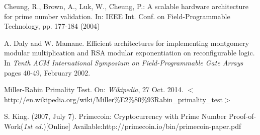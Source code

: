 \documentclass[journal]{IEEEtran}
\begin{document}
\ifCLASSOPTIONcaptionsoff
  \newpage
\fi





%
%
%
\begin{thebibliography}{1}

Cheung, R., Brown, A., Luk, W., Cheung, P.: A scalable hardware architecture for prime number validation. In: IEEE Int. Conf. on Field-Programmable Technology, pp. 177-184 (2004)

A. Daly and W. Mamane. Efficient architectures for implementing montgomery modular multiplication and RSA modular exponentiation on reconfigurable logic. In \textit{Tenth ACM International Symposium on Field-Programmable Gate Arrays} pages 40-49, February 2002.

Miller-Rabin Primality Test. On: \textit{Wikipedia}, 27 Oct. 2014. $<$http://en.wikipedia.org/wiki/Miller\%E2\%80\%93Rabin\_primality\_test$>$

S. King. (2007, July 7). Primecoin: Cryptocurrency with Prime Number Proof-of-Work(\textit{1st ed.})[Online] Available:http://primecoin.io/bin/primecoin-paper.pdf







\end{thebibliography}
\end{document}
